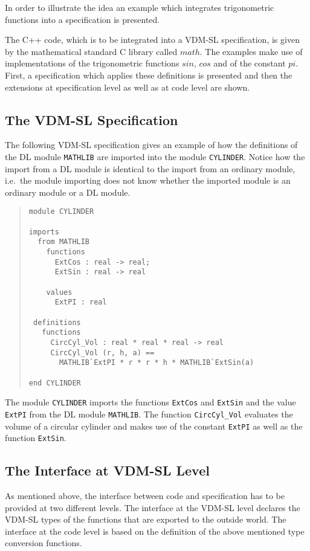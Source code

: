\documentclass[\pformat,12pt]{article}
\begin{document}
In order to illustrate the idea an example which integrates 
trigonometric functions into a specification is presented.

The C++ code, which is to be integrated into a VDM-SL specification,
is  given by the mathematical standard C library called $math$.
The examples make use of implementations of the trigonometric functions  
$sin$, $cos$ and of the constant $pi$. First, a specification
which applies these definitions is presented and then the extensions 
at specification level as well as at code level are shown.

\subsection*{The VDM-SL Specification}

The following VDM-SL specification gives an example of how the
definitions of the DL module {\tt MATHLIB} are imported into the module
{\tt CYLINDER}. Notice how the import from a DL module is identical to
the import from an ordinary module, i.e.\ the module importing does
not know whether the imported module is an ordinary module or a DL
module.

\begin{quote}
\begin{verbatim}
module CYLINDER

imports
  from MATHLIB
    functions
      ExtCos : real -> real;
      ExtSin : real -> real
   
    values
      ExtPI : real

 definitions
   functions
     CircCyl_Vol : real * real * real -> real
     CircCyl_Vol (r, h, a) ==
       MATHLIB`ExtPI * r * r * h * MATHLIB`ExtSin(a)

end CYLINDER      
\end{verbatim}
\end{quote}

The module {\tt CYLINDER} imports the functions {\tt ExtCos} and 
{\tt ExtSin} and the value {\tt ExtPI} from the DL
module {\tt MATHLIB}.
The function {\tt CircCyl\_Vol} evaluates the volume of a circular cylinder
and makes use of the constant {\tt ExtPI} as well as the function {\tt ExtSin}.
 
\subsection*{The Interface at VDM-SL Level}

As mentioned above, the interface between code and specification has
to be provided at two different levels. The interface at the VDM-SL
level declares the VDM-SL types of the functions that are exported to
the outside world.  The interface at the code level is based on the
definition of the above mentioned type conversion functions.
\end{document}
